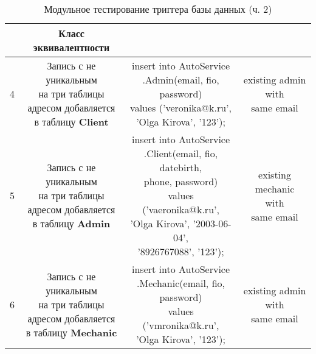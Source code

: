 \begin{table}[H]
	\centering
	\caption{\label{tab:teststrigger2}Модульное тестирование триггера базы данных (ч. 2)}
	\begin{tabular}{|l|c|c|c|}
		\hline \specialcell{№} & \specialcell{Класс\\эквивалентности} & \specialcell{Запрос для теста} & \specialcell{Результат}\\\hline
		4 & \makecell{Запись с не уникальным\\на три таблицы\\адресом добавляется\\в таблицу \textbf{Client}} & \makecell{insert into AutoService\\.Admin(email, fio,\\ password)\\values ('veronika@k.ru',\\'Olga Kirova', '123');} & \makecell{existing admin\\with\\same email} \\\hline
		5 & \makecell{Запись с не уникальным\\на три таблицы\\адресом добавляется\\в таблицу \textbf{Admin}} & \makecell{insert into AutoService\\.Client(email, fio, datebirth,\\phone, password)\\values ('vaeronika@k.ru',\\'Olga Kirova', '2003-06-04',\\'8926767088', '123');} & \makecell{existing mechanic\\with\\same email} \\\hline
		6 & \makecell{Запись с не уникальным\\на три таблицы\\адресом добавляется\\в таблицу \textbf{Mechanic}} & \makecell{insert into AutoService\\.Mechanic(email, fio,\\password)\\values ('vmronika@k.ru',\\'Olga Kirova', '123');} & \makecell{existing admin\\with\\same email} \\\hline
	\end{tabular}
\end{table}

